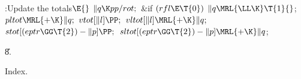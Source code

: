 \B{}:Update the totals\X${}\E{}$\6
$\|q\K\\{pp}/\\{rot};{}$\6
\&{if} ${}(\\{rfl}\E\T{0}){}$\1\5
${}\|q\MRL{{\LL}{\K}}\T{1}{}$;\2\6
${}\\{pltot}\MRL{+{\K}}\|q;{}$\6
${}\\{vtot}[\|l]\PP;{}$\6
${}\\{vltot}[\|l]\MRL{+{\K}}\|q;{}$\6
${}\\{stot}[(\\{eptr}\GG\T{2})-\|p]\PP;{}$\6
${}\\{sltot}[(\\{eptr}\GG\T{2})-\|p]\MRL{+{\K}}\|q{}$;\par
\U8.\fi

Index.
\fi

\inx
\fin
\con
